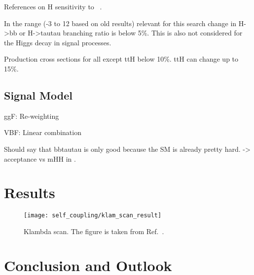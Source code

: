 References on H sensitivity to
\klambda~\cite{ATL-PHYS-PUB-2019-009,Degrassi:2016wml,Maltoni:2017ims}.

In the \klambda range (-3 to 12 based on old results) relevant for
this search change in H->bb or H->tautau branching ratio is below
5\%. This is also not considered for the Higgs decay in signal
processes.

Production cross sections for all except ttH below 10\%. ttH can
change up to 15\%.


\subsection{Signal Model}


ggF: Re-weighting

VBF: Linear combination




Should say that bbtautau is only good because the SM is already pretty
hard. -> acceptance vs mHH in \hadhad.


\section{Results}%
\label{sec:reinterpretation_results}


\begin{figure}[htbp]
  \centering

  \texttt{[image: self\_coupling/klam\_scan\_result]}

  \caption{Klambda scan. The figure is taken from
    Ref.~\cite{ATLAS-CONF-2021-052}.}%
  \label{fig:klambda_scan}
\end{figure}


\section{Conclusion and Outlook}%
\label{sec:reinterpretation_conclusion}


